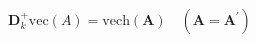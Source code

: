 \begin{equation}
	\mathbf{D}_{k}^{+}
	\mathrm{vec}
	\left(
	A
	\right)
	=
	\mathrm{vech}
	\left(
	\mathbf{A}
	\right)
	\quad
	\left(
	\mathbf{A}
	=
	\mathbf{A}^{\prime}
	\right)
	\label{eq:linearAlgebra-pinv-of-dcap-2}
\end{equation}
